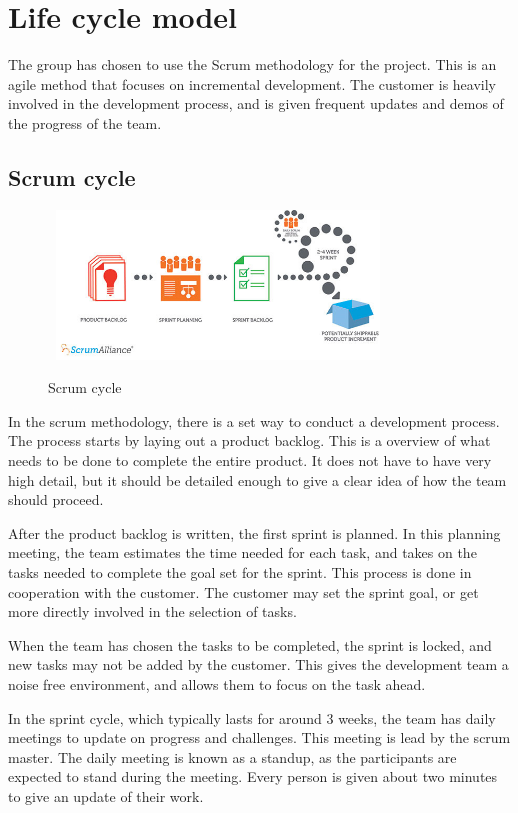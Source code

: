 \documentclass[11pt,a4paper,titlepage,oneside]{report}
\begin{document}
\section{Life cycle model}
\label{sec:Scrum}
The group has chosen to use the Scrum methodology for the project. This is an agile method that focuses on incremental development. The customer is heavily involved in the development process, and is given frequent updates and demos of the progress of the team. 

\subsection{Scrum cycle}
\begin{figure}[h]
\begin{center}
\includegraphics[height=150px,width=340px]{img/Scrum.jpg}
\caption{Scrum cycle}\cite{ScrumCycle}
\label{fig:gantt}
\medskip
\small
\end{center}
\end{figure}

In the scrum methodology, there is a set way to conduct a development process. The process starts by laying out a product backlog. This is a overview of what needs to be done to complete the entire product. It does not have to have very high detail, but it should be detailed enough to give a clear idea of how the team should proceed. 

After the product backlog is written, the first sprint is planned. In this planning meeting, the team estimates the time needed for each task, and takes on the tasks needed to complete the goal set for the sprint. This process is done in cooperation with the customer. The customer may set the sprint goal, or get more directly involved in the selection of tasks. 

When the team has chosen the tasks to be completed, the sprint is locked, and new tasks may not be added by the customer. This gives the development team a noise free environment, and allows them to focus on the task ahead. 

In the sprint cycle, which typically lasts for around 3 weeks, the team has daily meetings to update on progress and challenges. This meeting is lead by the scrum master. The daily meeting is known as a standup, as the participants are expected to stand during the meeting. Every person is given about two minutes to give an update of their work.
\end{document}
